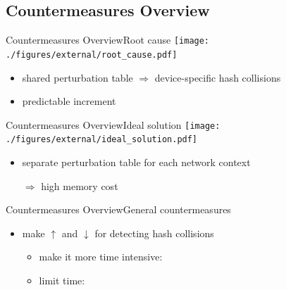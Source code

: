\documentclass[aspectratio=169, hyperref={colorlinks=true, allcolors=SecondaryColor}, c]{beamer}
\begin{document}
	\subsection{Countermeasures Overview}

	\begin{frame}[fragile]{Countermeasures Overview}{Root cause}
		\texttt{[image: ./figures/external/root\_cause.pdf]} %
		\begin{itemize}
			\item shared perturbation table \alert{$\Rightarrow$} device-specific hash collisions %
			\item predictable increment
		\end{itemize}
	\end{frame}

	\begin{frame}[fragile]{Countermeasures Overview}{Ideal solution}
		\texttt{[image: ./figures/external/ideal\_solution.pdf]} %
		\begin{itemize}
			\item separate perturbation table for each network context
			\item[\alert{$\Rightarrow$}] high memory cost %
		\end{itemize}
	\end{frame}

	\begin{frame}[fragile]{Countermeasures Overview}{General countermeasures}
		\begin{itemize}
			\item make \alert{\Large $\uparrow$} and \alert{\Large $\downarrow$}  for detecting hash collisions
			\begin{itemize}
				\item \alert{make it more time intensive}:

				\item \alert{limit time}:
				\vspace{-0.2cm}

			\end{itemize}
		\end{itemize}
	\end{frame}
\end{document}
